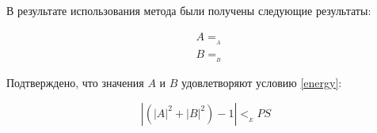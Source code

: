 В результате использования метода были получены следующие результаты:

\begin{equation}\label{__METHOD-results}
  \begin{aligned}
    &A=__A \\
    &B=__B
  \end{aligned}
\end{equation}

Подтверждено, что значения $A$ и $B$ удовлетворяют условию \ref{energy}:

\begin{displaymath}
  \left | \left( |A|^2 + |B|^2 \right) - 1 \right | < __EPS
\end{displaymath}
